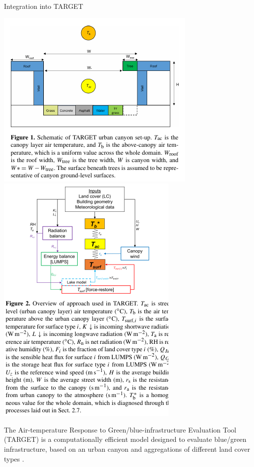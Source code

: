 \documentclass{beamer}
\begin{document}
\begin{frame}{Integration into TARGET} 

\begin{center}
\includegraphics[scale=0.60,trim={20 80 20 10},clip]{TARGET1.png}
\includegraphics[scale=0.60,trim={20 180 20 0},clip]{TARGET2.png}
\end{center}
The Air-temperature Response to Green/blue-infrastructure Evaluation Tool (TARGET) is a computationally efficient model designed to evaluate blue/green infrastructure, based on an urban canyon and aggregations of different land cover types \citep{Broadbent2019}.
\end{frame}
\end{document}
